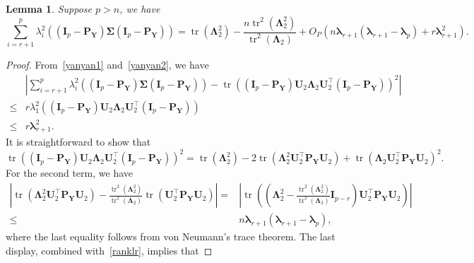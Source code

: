 \documentclass[10pt]{book}
\newtheorem{lemma}{Lemma}
\theoremstyle{definition}
\DeclareMathOperator{\mytr}{tr}
\newcommand{\bP}{\mathbf{P}}
\newcommand{\bY}{\mathbf{Y}}
\newcommand{\bI}{\mathbf{I}}
\newcommand{\bU}{\mathbf{U}}
\newcommand{\bfsym}[1]{\ensuremath{\boldsymbol{#1}}}
\def\blambda {\bfsym {\lambda}}
\def\bLambda {\bfsym {\Lambda}}
\def\bSigma {\bfsym {\Sigma}}
\begin{document}
\begin{lemma}\label{gg:Lemma2}
    Suppose $p>n$, we have
    \begin{equation*}
        \sum_{i=r+1}^{p}\lambda_i^2\left(
         (\bI_p -\bP_\bY)\bSigma (\bI_p- \bP_{\bY})
    \right)
        =
    \mytr(\bLambda_2^2)-\frac{n\mytr^2(\bLambda_2^2)}{\mytr^2(\bLambda_2)}
 +
O_P\left(n\blambda_{r+1}(\blambda_{r+1}-\blambda_p)+r \blambda_{r+1}^2\right).
    \end{equation*}
\end{lemma}
\begin{proof}
    From~\eqref{yanyan1} and~\eqref{yanyan2}, we have
    \begin{equation}\label{jojo100}
        \begin{split}
        &\left|
        \sum_{i=r+1}^{p}\lambda_i^2\left(
         (\bI_p -\bP_\bY)\bSigma (\bI_p- \bP_{\bY})
    \right)
    -
        \mytr\left(
         (\bI_p -\bP_\bY)\bU_2 \bLambda_2 \bU_2^\top (\bI_p- \bP_{\bY})
    \right)^2
    \right|
    \\
    \leq&
    r\lambda_1^2 \left(
         (\bI_p -\bP_\bY)\bU_2 \bLambda_2 \bU_2^\top (\bI_p- \bP_{\bY})
    \right)
    \\
    \leq & r \blambda_{r+1}^2.
        \end{split}
    \end{equation}
    It is straightforward to show that
    \begin{equation*}
        \mytr\left(
         (\bI_p -\bP_\bY)\bU_2 \bLambda_2 \bU_2^\top (\bI_p- \bP_{\bY})
    \right)^2
    =
    \mytr(\bLambda_2^2)
    -2\mytr(\bLambda_2^2 \bU_2^\top \bP_\bY \bU_2)
    + \mytr(\bLambda_2 \bU_2^\top \bP_\bY \bU_2)^2.
    \end{equation*}
    For the second term, we have
    \begin{equation*}
        \begin{split}
        \left|
 \mytr(\bLambda_2^2 \bU_2^\top \bP_\bY \bU_2)
 -
 \frac{\mytr^2(\bLambda_2^2)}{\mytr^2(\bLambda_2)}\mytr( \bU_2^\top \bP_\bY \bU_2)
 \right|
        =&\left|
        \mytr\left(\left(\bLambda_2^2-\frac{\mytr^2(\bLambda_2^2)}{\mytr^2(\bLambda_2)}\bI_{p-r}\right)  \bU_2^\top \bP_\bY \bU_2\right)
 \right|
 \\
 \leq &
 n\blambda_{r+1}(\blambda_{r+1}-\blambda_p),
        \end{split}
    \end{equation*}
    where the last equality follows from von Neumann's trace theorem.
    The last display, combined with~\eqref{ranklr}, implies that

\end{proof}
\end{document}
